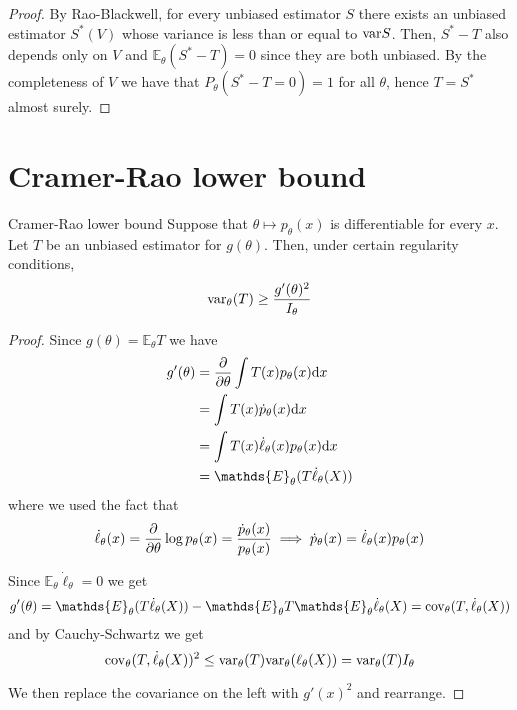 \documentclass[12pt]{extarticle}
\newcommand{\cov}{{\operatorfont cov}}
\renewcommand{\var}{{\operatorfont var}}
\newcommand{\E}{\mathds{E}}
\begin{document}
\begin{proof}
	By Rao-Blackwell, for every unbiased estimator $S$ there exists an unbiased estimator $S^*(V)$
	whose variance is less than or equal to $\var S$.
	Then, $S^* - T$ also depends only on $V$ and $\E_\theta(S^* - T) = 0$ since they are both unbiased.
	By the completeness of $V$ we have that $P_\theta(S^* - T = 0) = 1$ for all $\theta$,
	hence $T = S^*$ almost surely.
\end{proof}

\section{Cramer-Rao lower bound}

\begin{theorem}{Cramer-Rao lower bound}{}
	Suppose that $\theta \mapsto p_\theta(x)$ is differentiable for every $x$.
	Let $T$ be an unbiased estimator for $g(\theta)$.
	Then, under certain regularity conditions,
	\begin{equation}
		\var_\theta (T) \geq \frac{g'(\theta)^2}{I_\theta}
	\end{equation}
\end{theorem}

\begin{proof}
	Since $g(\theta) = \E_\theta T$ we have
	\begin{align}
		g'(\theta) & = \pdv{\theta} \int T(x) p_\theta(x) \dd x        \\
		           & = \int T(x) \dot{p}_\theta(x) \dd x               \\
		           & = \int T(x) \dot \ell_\theta(x) p_\theta(x) \dd x \\
		           & = \E_\theta (T \dot \ell_\theta (X))
	\end{align}
	where we used the fact that
	\begin{equation}
		\dot \ell_\theta(x) = \pdv{\theta} \log p_\theta(x) = \frac{\dot p_\theta(x)}{p_\theta(x)}
		\implies \dot p_\theta(x) = \dot \ell_\theta(x) p_\theta(x)
	\end{equation}

	Since $\E_\theta \dot \ell_\theta = 0$ we get
	\begin{equation}
		g'(\theta) = \E_\theta (T \dot \ell_\theta (X)) - \E_\theta T \E_\theta \dot \ell_\theta(X) = \cov_\theta(T, \dot \ell_\theta(X))
	\end{equation}
	and by Cauchy-Schwartz we get
	\begin{equation}
		\cov_\theta(T, \dot \ell_\theta(X))^2 \leq \var_\theta (T) \var_\theta (\ell_\theta(X)) = \var_\theta (T) I_\theta
	\end{equation}

	We then replace the covariance on the left with $g'(x)^2$ and rearrange.
\end{proof}
\end{document}
